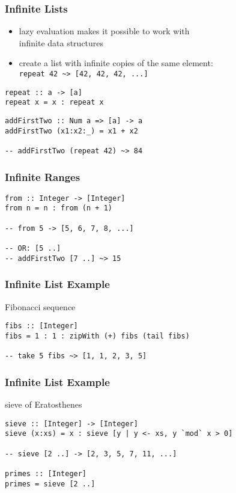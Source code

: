 \documentclass[dvipsnames]{beamer}
\theoremstyle{plain}
\begin{document}
\begin{frame}[fragile]
  \frametitle{Infinite Lists}

  \begin{itemize}
    \item lazy evaluation makes it possible to work with\\
      infinite data structures
    \item create a list with infinite copies of the same element:\\
      \lstinline|repeat 42 ~> [42, 42, 42, ...]|
  \end{itemize}

  \begin{exampleblock}{}
    \begin{lstlisting}[deletekeywords={repeat}]
repeat :: a -> [a]
repeat x = x : repeat x
    \end{lstlisting}

    \pause
    \medskip
    \begin{lstlisting}
addFirstTwo :: Num a => [a] -> a
addFirstTwo (x1:x2:_) = x1 + x2

-- addFirstTwo (repeat 42) ~> 84
    \end{lstlisting}
  \end{exampleblock}
\end{frame}

\begin{frame}[fragile]
  \frametitle{Infinite Ranges}

  \begin{lstlisting}
from :: Integer -> [Integer]
from n = n : from (n + 1)

-- from 5 -> [5, 6, 7, 8, ...]

-- OR: [5 ..]
-- addFirstTwo [7 ..] ~> 15
  \end{lstlisting}
\end{frame}

\begin{frame}[fragile]
  \frametitle{Infinite List Example}

  \begin{exampleblock}{Fibonacci sequence}
    \begin{lstlisting}
fibs :: [Integer]
fibs = 1 : 1 : zipWith (+) fibs (tail fibs)

-- take 5 fibs ~> [1, 1, 2, 3, 5]
    \end{lstlisting}
  \end{exampleblock}
\end{frame}

\begin{frame}[fragile]
  \frametitle{Infinite List Example}

  \begin{exampleblock}{sieve of Eratosthenes}
    \begin{lstlisting}
sieve :: [Integer] -> [Integer]
sieve (x:xs) = x : sieve [y | y <- xs, y `mod` x > 0]

-- sieve [2 ..] -> [2, 3, 5, 7, 11, ...]

primes :: [Integer]
primes = sieve [2 ..]
    \end{lstlisting}
  \end{exampleblock}
\end{frame}
\end{document}
